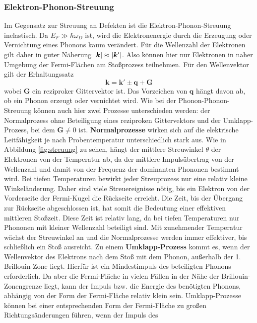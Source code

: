 \documentclass[11pt]{article}
\DeclarePairedDelimiter\abs{\lvert}{\rvert}
\begin{document}
\subsubsection{Elektron-Phonon-Streuung}
Im Gegensatz zur Streuung an Defekten ist die Elektron-Phonon-Streuung
inelastisch. Da $E_F\gg\hbar\omega_D$ ist, wird die Elektronenergie durch die
Erzeugung oder Vernichtung eines Phonons kaum verändert. Für die Wellenzahl der
Elektronen gilt daher in guter Näherung $\abs{\bm{k}}\approx\abs{\bm{k}'}$.
Also können hier nur Elektronen in naher Umgebung der Fermi-Flächen am
Stoßprozess teilnehmen.
Für den Wellenvektor gilt der Erhaltungssatz
\begin{equation}
  \bm{k}=\bm{k}'\pm\bm{q}+\bm{G}
\end{equation}
wobei $\bm{G}$ ein reziproker Gittervektor ist. Das Vorzeichen von $\bm{q}$
hängt davon ab, ob ein Phonon erzeugt oder vernichtet wird. Wie bei der
Phonon-Phonon-Streuung können auch hier zwei Prozesse unterschieden werden:
der Normalprozess ohne Beteiligung eines reziproken Gittervektors und der
Umklapp-Prozess, bei dem $\bm{G}\neq0$ ist. \textbf{Normalprozesse} wirken sich
auf die elektrische Leitfähigkeit je nach Probentemperatur unterschiedlich
stark aus. Wie in Abbildung \ref{fig:streuung} zu sehen, hängt der mittlere
Streuwinkel $\theta$ der Elektronen von der Temperatur ab, da der mittlere
Impulsübertrag von der Wellenzahl und damit von der Frequenz der dominanten
Phononen bestimmt wird. Bei tiefen Temperaturen bewirkt jeder Streuprozess nur
eine relativ kleine Winkeländerung. Daher sind viele Streuereignisse nötig, bis
ein Elektron von der Vorderseite der Fermi-Kugel die Rückseite erreicht. Die
Zeit, bis der Übergang zur Rückseite abgeschlossen ist, hat somit die Bedeutung
einer effektiven mittleren Stoßzeit. Diese Zeit ist relativ lang, da bei tiefen
Temperaturen nur Phononen mit kleiner Wellenzahl beteiligt sind. Mit zunehmender
Temperatur wächst der Streuwinkel an und die Normalprozesse werden immer
effektiver, bis schließlich ein Stoß ausreicht. Zu einem
\textbf{Umklapp-Prozess} kommt es, wenn der Wellenvektor des Elektrons nach dem
Stoß mit dem Phonon, außerhalb der 1. Brillouin-Zone liegt. Hierfür ist ein
Mindestimpuls des beteiligten Phonons erforderlich. Da aber die Fermi-Fläche
in vielen Fällen in der Nähe der Brillouin-Zonengrenze liegt, kann der Impuls
bzw. die Energie des benötigten Phonons, abhängig von der Form der Fermi-Fläche
relativ klein sein. Umklapp-Prozesse können bei einer entsprechenden Form der
Fermi-Fläche zu großen Richtungsänderungen führen, wenn der Impuls des
\end{document}
